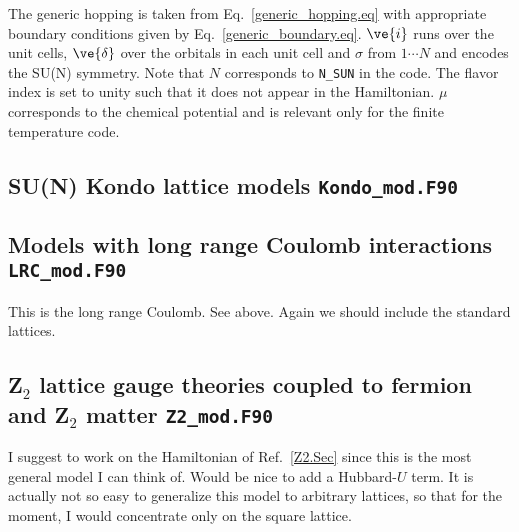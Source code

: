 The  generic hopping is taken from Eq.~\ref{generic_hopping.eq}   with appropriate boundary conditions given by Eq.~\ref{generic_boundary.eq}.    $\ve{i}$ runs over the unit cells, $\ve{\delta}$ over the orbitals in each unit cell and $\sigma$  from $1 \cdots N$  and encodes  the SU(N) symmetry.    Note that  $N$ corresponds to \texttt{N\_SUN}  in the code.  The flavor index is set to  unity such that it does not appear in the  Hamiltonian.  $\mu$ corresponds to the chemical potential  and is relevant only for the finite temperature code. 

\subsection{  SU(N) Kondo lattice models  \texttt{Kondo\_mod.F90}}





\subsection{  Models with long range Coulomb interactions  \texttt{LRC\_mod.F90}}

This is the long range Coulomb. See above.    Again we should include the   standard lattices. 

\subsection{Z$_2$ lattice gauge theories coupled to fermion and  Z$_2$ matter    \texttt{Z2\_mod.F90}}
I suggest to work on the  Hamiltonian of Ref.~\ref{Z2.Sec} since this is the most general  model I can think of.   Would be nice to add a Hubbard-$U$ term.  It is actually not so easy to generalize this model to 
arbitrary lattices, so that for the moment, I would concentrate only on the square lattice. 
